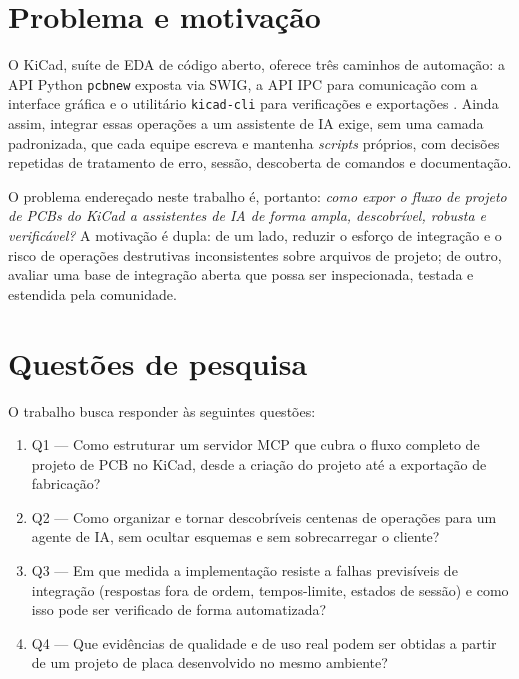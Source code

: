 \section{Problema e motivação}

O KiCad, suíte de EDA de código aberto, oferece três caminhos de automação: a
API Python \texttt{pcbnew} exposta via SWIG, a API IPC para comunicação com a
interface gráfica e o utilitário \texttt{kicad-cli} para verificações e
exportações \citep{swig,kicaddev,kicadcli}. Ainda assim, integrar essas
operações a um assistente de IA exige, sem uma camada padronizada, que cada
equipe escreva e mantenha \emph{scripts} próprios, com decisões repetidas de
tratamento de erro, sessão, descoberta de comandos e documentação.

O problema endereçado neste trabalho é, portanto: \emph{como expor o fluxo de
projeto de PCBs do KiCad a assistentes de IA de forma ampla, descobrível,
robusta e verificável?} A motivação é dupla: de um lado, reduzir o esforço de
integração e o risco de operações destrutivas inconsistentes sobre arquivos de
projeto; de outro, avaliar uma base de integração aberta que possa ser
inspecionada, testada e estendida pela comunidade.

\section{Questões de pesquisa}

O trabalho busca responder às seguintes questões:

\begin{enumerate}[leftmargin=1.4em,itemsep=0.2em]
  \item Q1 --- Como estruturar um servidor MCP que cubra o fluxo completo de
        projeto de PCB no KiCad, desde a criação do projeto até a exportação
        de fabricação?
  \item Q2 --- Como organizar e tornar descobríveis centenas de operações para
        um agente de IA, sem ocultar esquemas e sem sobrecarregar o cliente?
  \item Q3 --- Em que medida a implementação resiste a falhas previsíveis de
        integração (respostas fora de ordem, tempos-limite, estados de sessão)
        e como isso pode ser verificado de forma automatizada?
  \item Q4 --- Que evidências de qualidade e de uso real podem ser obtidas a
        partir de um projeto de placa desenvolvido no mesmo ambiente?
\end{enumerate}

